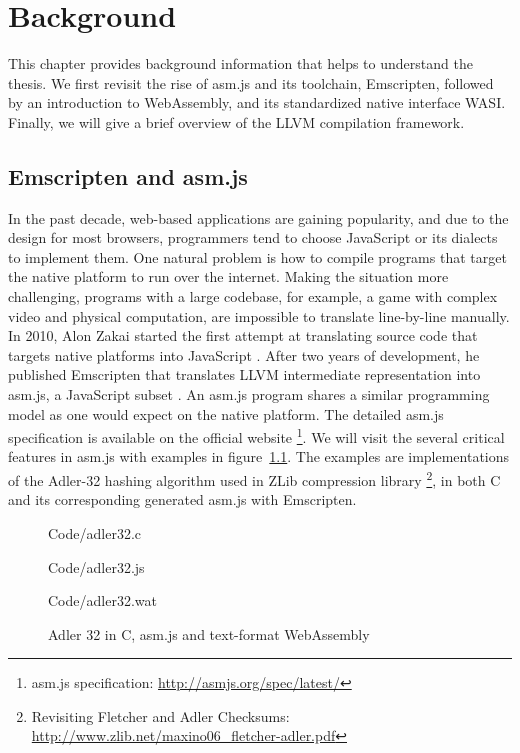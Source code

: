 \chapter{Background}
This chapter provides background information that helps to understand the
thesis. We first revisit the rise of asm.js and its toolchain, Emscripten,
followed by an introduction to WebAssembly, and its standardized native
interface WASI. Finally, we will give a brief overview of the LLVM compilation
framework.

\section{Emscripten and asm.js}

In the past decade, web-based applications are gaining popularity, and due to
the design for most browsers, programmers tend to choose JavaScript or its
dialects to implement them. One natural problem is how to compile programs that
target the native platform to run over the internet. Making the situation more
challenging, programs with a large codebase, for example, a game with complex
video and physical computation, are impossible to translate line-by-line
manually. In 2010, Alon Zakai started the first attempt at translating source
code that targets native platforms into JavaScript \cite{8118483}. After two
years of development, he published Emscripten that translates LLVM intermediate
representation into asm.js, a JavaScript subset \cite{10.1145/2048147.2048224}.
An asm.js program shares a similar programming model as one would expect on the
native platform. The detailed asm.js specification is available on the official
website \footnote{asm.js specification: \url{http://asmjs.org/spec/latest/}}.
We will visit the several critical features in asm.js with examples in
figure~\ref{fig:alder-32}. The examples are implementations of the Adler-32
hashing algorithm used in ZLib compression library \cite{adler32-paper}
\footnote{Revisiting Fletcher and Adler Checksums:
\\\url{http://www.zlib.net/maxino06\_fletcher-adler.pdf}}, in both C and its
corresponding generated asm.js with Emscripten.

\begin{figure}
  \centering
  
  {Code/adler32.c}
  
  {Code/adler32.js}
  
  {Code/adler32.wat}
  \caption{Adler 32 in C, asm.js and text-format WebAssembly}
  \label{fig:alder-32}
\end{figure}

